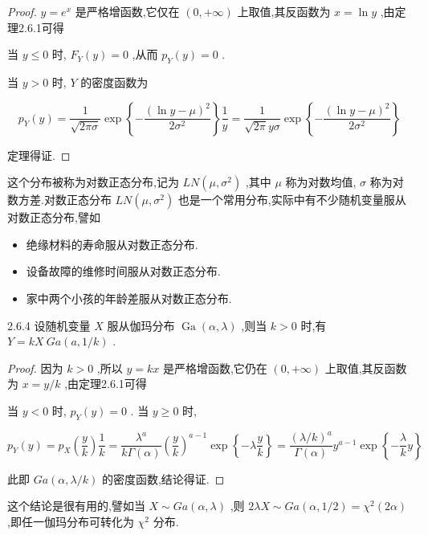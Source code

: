 \begin{proof}
	 $ y=e^{x} $ 是严格增函数,它仅在 $ (0,+\infty) $ 上取值,其反函数为 $ x=\ln y $ ,由定理2.6.1可得
	
	当 $ y \leqslant 0 $ 时, $ F_{Y}(y)=0 $ ,从而 $ p_{Y}(y)=0 $ .
	
	当 $ y>0 $ 时, $ Y $ 的密度函数为
	
	\[
	p_{Y}(y)=\frac{1}{\sqrt{2 \pi \sigma}} \exp \left\{-\frac{(\ln y-\mu)^{2}}{2 \sigma^{2}}\right\} \frac{1}{y}=\frac{1}{\sqrt{2 \pi} y \sigma} \exp \left\{-\frac{(\ln y-\mu)^{2}}{2 \sigma^{2}}\right\}
	\]
	
	定理得证.
\end{proof} 


这个分布被称为对数正态分布,记为 $ L N\left(\mu, \sigma^{2}\right) $ ,其中 $ \mu $ 称为对数均值, $ \sigma $ 称为对数方差.对数正态分布 $ L N\left(\mu, \sigma^{2}\right) $ 也是一个常用分布,实际中有不少随机变量服从对数正态分布,譬如

\begin{itemize}
	\item 绝缘材料的寿命服从对数正态分布.
	\item 设备故障的维修时间服从对数正态分布.
	\item 家中两个小孩的年龄差服从对数正态分布.
\end{itemize}

\begin{theorem}{}{2.6.4}
	设随机变量 $ X $ 服从伽玛分布 $ \operatorname{Ga}(\alpha, \lambda) $ ,则当 $ k>0 $ 时,有 $ Y=kX~Ga(a,1/k) $ .
\end{theorem}

\begin{proof}
	因为 $ k>0 $ ,所以 $ y=kx $ 是严格增函数,它仍在 $ (0,+\infty) $ 上取值,其反函数为 $ x=y/k $ ,由定理2.6.1可得
	
	当 $ y<0 $ 时, $ p_{Y}(y)=0 $ .
	当 $ y \geqslant 0 $ 时,
	
	\[
	p_{Y}(y)=p_{X}\left(\frac{y}{k}\right) \frac{1}{k}=\frac{\lambda^{a}}{k \Gamma(\alpha)}\left(\frac{y}{k}\right)^{a-1} \exp \left\{-\lambda \frac{y}{k}\right\}=\frac{(\lambda / k)^{a}}{\Gamma(\alpha)} y^{a-1} \exp \left\{-\frac{\lambda}{k} y\right\}
	\]
	
	此即 $ G a(\alpha, \lambda / k) $ 的密度函数,结论得证.
\end{proof}

这个结论是很有用的,譬如当 $ X \sim G a(\alpha, \lambda) $ ,则 $ 2 \lambda X \sim G a(\alpha, 1 / 2)= \chi^{2}(2 \alpha) $ ,即任一伽玛分布可转化为 $ \chi^{2} $ 分布.

